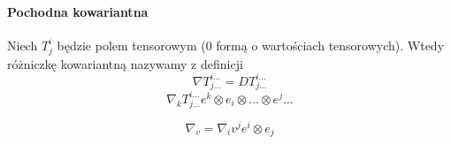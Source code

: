 \documentclass[11pt]{book}
\theoremstyle{definition} %
\theoremstyle{plain} %
\theoremstyle{remark} %
\theoremstyle{underline}
\begin{document}
  \paragraph{Pochodna kowariantna}
  Niech $T^i_j$ będzie polem tensorowym (0 formą o wartościach tensorowych).
  Wtedy różniczkę kowariantną nazywamy z definicji 
  \begin{displaymath}
    \nabla T^{i\dots}_{j\dots} = D T^{i \dots}_{j\dots}
  \end{displaymath}
  \begin{displaymath}
    \nabla_k T^{i\dots}_{j\dots} e^k\otimes e_i\otimes \dots \otimes e^j \dots
  \end{displaymath}
  
  
  \begin{displaymath}
    \nabla_v = \nabla_i v^j e^i\otimes e_j
  \end{displaymath}
  
  


  
  
  
  

  
  
  
  

  

  
  

  
  
\end{document}
